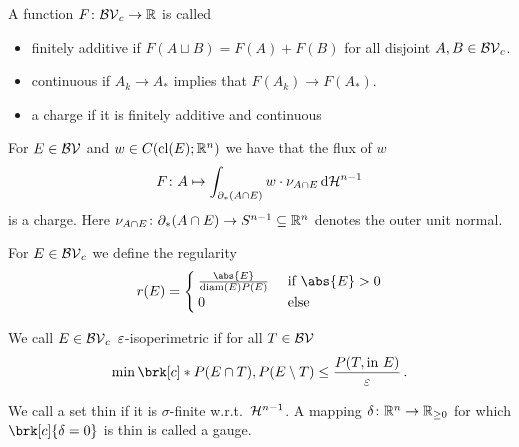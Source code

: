 \begin{frame}
	\begin{definition}[Charge]
	A function $F\colon \mathcal{BV}_c\to\mathbb{R}$ is called
	\begin{itemize}
		\item finitely additive if $F(A\sqcup B) =F(A)+F(B)$ for all disjoint $A,B\in\mathcal{BV}_c$.
		\item continuous if $A_k\to A_*$ implies that $F(A_k)\to F(A_*)$.
		\item a charge if it is finitely additive and continuous
	\end{itemize}
	\end{definition}
	\begin{Example}
	For $E\in\mathcal{BV}$  and $w\in C(\operatorname{cl}(E);\mathbb{R}^n)$ we have that the flux of $w$
	\begin{align*}
		F\colon A\mapsto \int_{\partial_*(A\cap E)}w\cdot\nu_{A\cap E}\,\mathrm{d} \mathcal{H}^{n-1}
	\end{align*}
	is a charge. Here $\nu_{A\cap E}\colon \partial_*(A\cap E)\to S^{n-1}\subseteq\mathbb{R}^n$ denotes the outer unit normal.
	\end{Example}
\end{frame}

\begin{frame}
	\begin{definition}
	For $E\in \mathcal{BV}_c$ we define the regularity
	\begin{align*}
		r(E)=\begin{cases}
			\frac{\abs{E}}{\diam(E)P(E)} &\text{ if }\abs{E}>0 \\
			0 &\text{ else}
		\end{cases}
	\end{align*}
	\end{definition}
	\begin{definition}[$\e$-isoperimetric]
	We call $E\in\mathcal{BV}_c$ $\e$-isoperimetric if for all $T\in\mathcal{BV}$
	\begin{align*}
		\min\brk[c]*{P(E\cap T),P(E\setminus T)}\leq \frac{P(T,\text{in }E)}{\e}\,.
	\end{align*}
	\end{definition}
	\begin{definition}[Gauge]
	We call a set thin if it is $\sigma$-finite w.r.t.\ $\mathcal{H}^{n-1}$. A mapping $\delta\colon\mathbb{R}^n\to\mathbb{R}_{\geq 0}$ for which $\brk[c]{\delta=0}$ is thin is called a gauge.
	\end{definition}
\end{frame}

